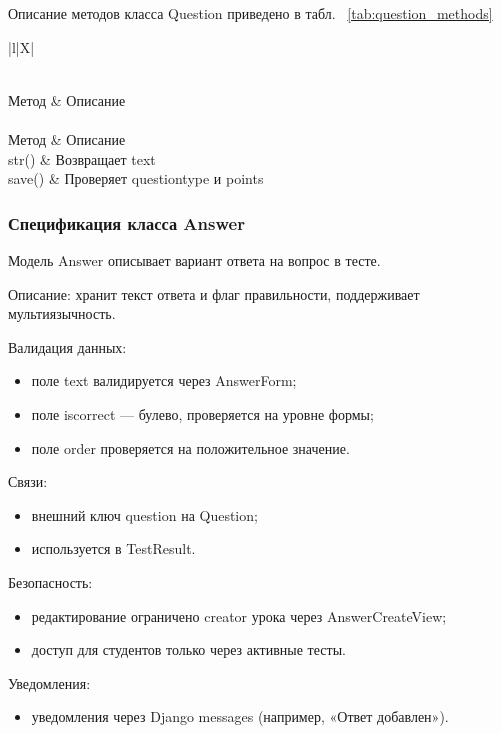 Описание методов класса Question приведено в табл. ~\ref {tab:question_methods}

\begin{xltabular}{\textwidth}{|l|X|}
	\caption{Методы класса Question\label{tab:question_methods}}\\
	\hline
	Метод & Описание \\ \hline
	\endfirsthead
	\\
	\hline
	Метод & Описание \\ \hline
	\endhead
	str() & Возвращает text \\ \hline
	save() & Проверяет questiontype и points \\ \hline
\end{xltabular}

\subsubsection{Спецификация класса Answer}

Модель Answer описывает вариант ответа на вопрос в тесте.

Описание: хранит текст ответа и флаг правильности, поддерживает мультиязычность.

Валидация данных:
	\begin{itemize}
		\item поле text валидируется через AnswerForm;
		\item поле iscorrect — булево, проверяется на уровне формы;
		\item поле order проверяется на положительное значение.
	\end{itemize}
	
Связи:
	\begin{itemize}
		\item внешний ключ question на Question;
		\item используется в TestResult.
	\end{itemize}
	
Безопасность:
	\begin{itemize}
		\item редактирование ограничено creator урока через AnswerCreateView;
		\item доступ для студентов только через активные тесты.
	\end{itemize}
	
Уведомления:
	\begin{itemize}
		\item уведомления через Django messages (например, «Ответ добавлен»).
	\end{itemize}
	
